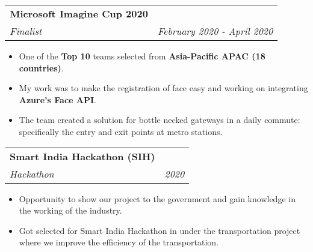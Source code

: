 \documentclass[a4paper,6pt]{article}
\begin{document}
\vspace{5px}
\hspace{5px}
\begin{tabularx}{\textwidth}{X r}
	\large{\textbf{Microsoft Imagine Cup 2020}} \vspace{2px} & \\
	\textit{\small Finalist}& \textit{February 2020 - April 2020} \\
\end{tabularx}
\small
\begin{itemize}
	\itemsep0em
	\item One of the \textcolor{mygray}{\textbf{Top 10}} teams selected from \textcolor{mygray}{\textbf{Asia-Pacific APAC (18 countries)}}.
	\item My work was to make the registration of face easy and working on integrating \textcolor{mygray}{\textbf{Azure’s Face API}}.
	\item The team created a solution for bottle necked gateways in a daily commute: specifically the entry and exit points at metro stations.
\end{itemize}

\vspace{4px}
\hspace{5px}
\begin{tabularx}{\textwidth}{X r}
	\large{\textbf{Smart India Hackathon (SIH)}} \vspace{1px} & \\
	\textit{\small Hackathon}& \textit{2020} \\
\end{tabularx}

\small
\begin{itemize}
	\itemsep0em
	\item Opportunity to show our project to the government and gain knowledge in the working of the industry.
	\item Got selected for Smart India Hackathon in under the transportation project where we improve the efficiency of the transportation.
\end{itemize}

\normalsize

\vspace{-9px}
\end{document}
